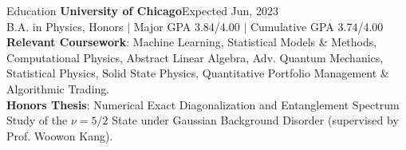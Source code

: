 \documentclass{resume} %
\begin{document}
\vspace{-0.6em}
\begin{rSection}{Education}
{\bf University of Chicago}\hfill {Expected Jun, 2023}\\
B.A. in Physics, Honors $|$ Major GPA 3.84/4.00 $|$ Cumulative GPA 3.74/4.00
\smallskip\\
\textbf{Relevant Coursework}: Machine Learning, Statistical Models \& Methods, Computational Physics, Abstract Linear Algebra, Adv. Quantum Mechanics, Statistical Physics, Solid State Physics, Quantitative Portfolio Management \& Algorithmic Trading.\smallskip\\
\textbf{Honors Thesis}: Numerical Exact Diagonalization and Entanglement Spectrum Study of the $\nu = 5/2$ State under Gaussian Background Disorder (supervised by Prof. Woowon Kang).


\end{rSection}
\end{document}
